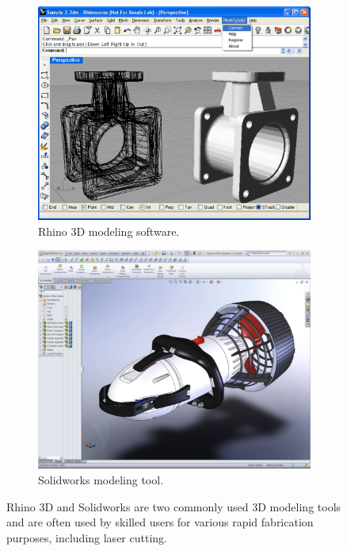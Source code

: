 \begin{figure}
  \centering
  \begin{subfigure}[t]{0.42\textwidth}
    \includegraphics[width=\linewidth]{img/rhino3d-screenshot.pdf}
    \caption{Rhino 3D modeling software.}
    \label{fig:rhino3d-screenshot}
  \end{subfigure}
  \hspace{1cm} %
  \begin{subfigure}[t]{0.42\textwidth}
    \includegraphics[width=\linewidth]{img/solidworks-screenshot.pdf}
    \caption{Solidworks modeling tool.}
    \label{fig:solidworks-screenshot}
  \end{subfigure}
  \caption[Advanced 3D CAD Software]{Rhino 3D and Solidworks are two commonly used 3D modeling tools and are often used by skilled users for various rapid fabrication purposes, including laser cutting.}
  \label{fig:cad-screenshots}
\end{figure}
